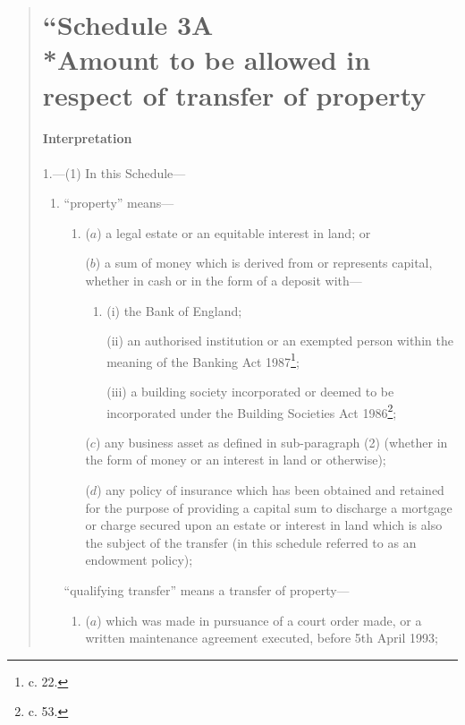 \documentclass[12pt,a4paper]{article}
\begin{document}
\begin{quotation}
\part*{``Schedule 3A\\*Amount to be allowed in respect of transfer of property}

\subsection*{Interpretation}

1.—(1) In this Schedule—
\begin{enumerate}\item[]
“property” means—
\begin{enumerate}\item[]
($a$) a legal estate or an equitable interest in land; or

($b$) a sum of money which is derived from or represents capital, whether in cash or in the form of a deposit with—
\begin{enumerate}\item[]
(i) the Bank of England;

(ii) an authorised institution or an exempted person within the meaning of the Banking Act 1987\footnote{ c. 22.};

(iii) a building society incorporated or deemed to be incorporated under the Building Societies Act 1986\footnote{ c. 53.};
\end{enumerate}

\begin{sloppypar}
($c$) any business asset as defined in sub-paragraph (2) (whether in the form of money or an interest in land or otherwise);
\end{sloppypar}

($d$) any policy of insurance which has been obtained and retained for the purpose of providing a capital sum to discharge a mortgage or charge secured upon an estate or interest in land which is also the subject of the transfer (in this schedule referred to as an endowment policy);
\end{enumerate}

“qualifying transfer” means a transfer of property—
\begin{enumerate}\item[]
($a$) which was made in pursuance of a court order made, or a written maintenance agreement executed, before 5th April 1993;


\end{enumerate}
\end{enumerate}
\end{quotation}
\end{document}
